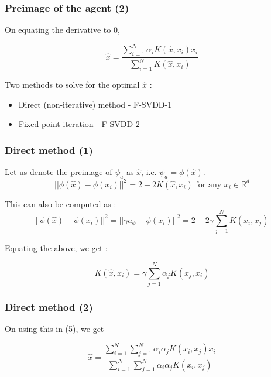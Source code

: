 \documentclass{beamer}
\begin{document}
\begin{frame}
\frametitle{Preimage of the agent (2)}
On equating the derivative to 0,

\begin{equation}
\hat{x} = \frac{\sum\limits_{i=1}^N \alpha_i K(\hat{x},x_i)x_i}{\sum\limits_{i=1}^N K(\hat{x},x_i)}
\end{equation}  


Two methods to solve for the optimal $\hat{x}$ :

\begin{itemize}
\item Direct (non-iterative) method - F-SVDD-1

\item Fixed point iteration  - F-SVDD-2

\end{itemize}
\end{frame}


\begin{frame}
\frametitle{Direct method (1)}
Let us denote the preimage of $\psi_a$ as $\hat{x}$, i.e. $ \psi_a = \phi(\hat{x})$.
\[ || \phi(\hat{x}) - \phi(x_i) ||^2  = 2 - 2 K(\hat{x},x_i)  \text{ for any } x_i \in \mathbb{R}^d\] 

This can also be computed as :
\[ || \phi(\hat{x}) - \phi(x_i) ||^2  = || \gamma a_\phi - \phi(x_i) ||^2  = 2 - 2 \gamma \sum\limits_{j=1}^N K(x_i,x_j) \]

Equating the above, we get :

\[ K(\hat{x},x_i)  = \gamma \sum\limits_{j=1}^N \alpha_j K(x_j,x_i) \] 

\end{frame}

\begin{frame}
\frametitle{Direct method (2)}

On using this in (5), we get 

\[ \hat{x} = \frac{\sum\limits_{i=1}^N \sum\limits_{j=1}^N \alpha_i \alpha_j K(x_i,x_j) x_i}{\sum\limits_{i=1}^N \sum\limits_{j=1}^N \alpha_i \alpha_j K(x_i,x_j)} \]


\end{frame}
\end{document}
